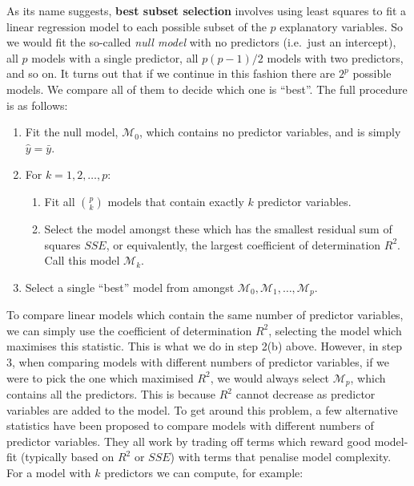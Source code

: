 \documentclass[
]{article}
\providecommand{\tightlist}{%
  \setlength{\itemsep}{0pt}\setlength{\parskip}{0pt}}
\begin{document}
As its name suggests, \textbf{best subset selection} involves using
least squares to fit a linear regression model to each possible subset
of the \(p\) explanatory variables. So we would fit the so-called
\emph{null model} with no predictors (i.e.~just an intercept), all \(p\)
models with a single predictor, all \(p(p-1)/2\) models with two
predictors, and so on. It turns out that if we continue in this fashion
there are \(2^p\) possible models. We compare all of them to decide
which one is ``best''. The full procedure is as follows:

\begin{enumerate}
\def\labelenumi{\arabic{enumi}.}
\tightlist
\item
  Fit the null model, \(\mathcal{M}_0\), which contains no predictor
  variables, and is simply \(\hat{y} = \bar{y}\).
\item
  For \(k=1,2,\ldots,p\):

  \begin{enumerate}
  \def\labelenumii{\alph{enumii})}
  \tightlist
  \item
    Fit all \(\binom{p}{k}\) models that contain exactly \(k\) predictor
    variables.
  \item
    Select the model amongst these which has the smallest residual sum
    of squares \(SSE\), or equivalently, the largest coefficient of
    determination \(R^2\). Call this model \(\mathcal{M}_k\).
  \end{enumerate}
\item
  Select a single ``best'' model from amongst
  \(\mathcal{M}_0, \mathcal{M}_1, \ldots, \mathcal{M}_p\).
\end{enumerate}

To compare linear models which contain the same number of predictor
variables, we can simply use the coefficient of determination \(R^2\),
selecting the model which maximises this statistic. This is what we do
in step 2(b) above. However, in step 3, when comparing models with
different numbers of predictor variables, if we were to pick the one
which maximised \(R^2\), we would always select \(\mathcal{M}_p\), which
contains all the predictors. This is because \(R^2\) cannot decrease as
predictor variables are added to the model. To get around this problem,
a few alternative statistics have been proposed to compare models with
different numbers of predictor variables. They all work by trading off
terms which reward good model-fit (typically based on \(R^2\) or
\(SSE\)) with terms that penalise model complexity. For a model with
\(k\) predictors we can compute, for example:
\end{document}

